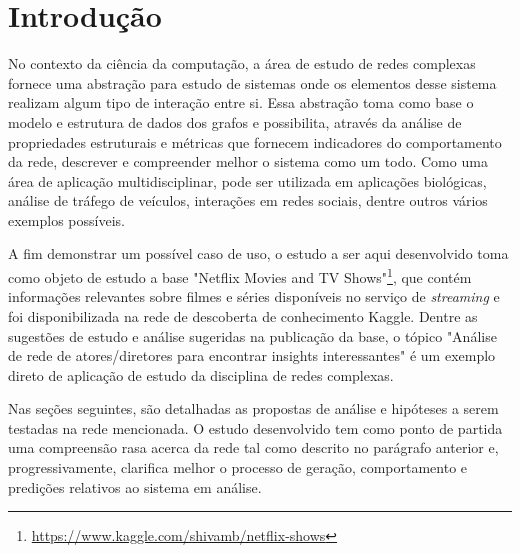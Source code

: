 \chapter[Introdução]{Introdução}

No contexto da ciência da computação, a área de estudo de redes complexas fornece uma abstração para estudo de sistemas onde os elementos desse sistema realizam algum tipo de interação entre si. Essa abstração toma como base o modelo e estrutura de dados dos grafos e possibilita, através da análise de propriedades estruturais e métricas que fornecem indicadores do comportamento da rede, descrever e compreender melhor o sistema como um todo. Como uma área de aplicação multidisciplinar, pode ser utilizada em aplicações biológicas, análise de tráfego de veículos, interações em redes sociais, dentre outros vários exemplos possíveis.

A fim demonstrar um possível caso de uso, o estudo a ser aqui desenvolvido toma como objeto de estudo a base "Netflix Movies and TV Shows"\footnote{\href{https://www.kaggle.com/shivamb/netflix-shows}{https://www.kaggle.com/shivamb/netflix-shows}}, que contém informações relevantes sobre filmes e séries disponíveis no serviço de \textit{streaming} e foi disponibilizada na rede de descoberta de conhecimento Kaggle. Dentre as sugestões de estudo e análise sugeridas na publicação da base, o tópico "Análise de rede de atores/diretores para encontrar insights interessantes" é um exemplo direto de aplicação de estudo da disciplina de redes complexas.

Nas seções seguintes, são detalhadas as propostas de análise e hipóteses a serem testadas na rede mencionada. O estudo desenvolvido tem como ponto de partida uma compreensão rasa acerca da rede tal como descrito no parágrafo anterior e, progressivamente, clarifica melhor o processo de geração, comportamento e predições relativos ao sistema em análise.